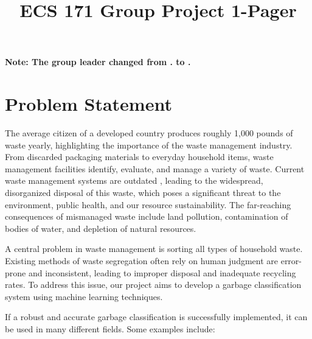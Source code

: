 \documentclass[conference]{IEEEtran}
\begin{document}
\title{\Huge ECS 171 Group Project 1-Pager}

\author{
  \centering
}

\maketitle

\large \textbf{Note: The group leader changed from . to .}

\section{Problem Statement}

The average citizen of a developed country produces roughly 1,000 pounds of waste yearly, highlighting the importance of the waste management industry. From discarded packaging materials to everyday household items, waste management facilities identify, evaluate, and manage a variety of waste. Current waste management systems are outdated \cite{b1}, leading to the widespread, disorganized disposal of this waste, which poses a significant threat to the environment, public health, and our resource sustainability. The far-reaching consequences of mismanaged waste include land pollution, contamination of bodies of water, and depletion of natural resources.

A central problem in waste management is sorting all types of household waste. Existing methods of waste segregation often rely on human judgment are error-prone and inconsistent, leading to improper disposal and inadequate recycling rates. To address this issue, our project aims to develop a garbage classification system using machine learning techniques. 

If a robust and accurate garbage classification is successfully implemented, it can be used in many different fields. Some examples include:
\end{document}
